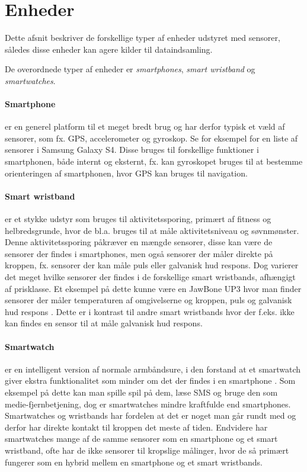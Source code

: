 \section{Enheder}\label{sec:kilder-til-sensorer}
Dette afsnit beskriver de forskellige typer af enheder udstyret med sensorer, således disse enheder kan agere kilder til dataindsamling.

De overordnede typer af enheder er \textit{smartphones}, \textit{smart wristband} og \textit{smartwatches}. 

\paragraph{Smartphone}
er en generel platform til et meget bredt brug og har derfor typisk et væld af sensorer, som fx. GPS, accelerometer og gyroskop. 
Se for eksempel \citet{misc:samsungs4sensors} for en liste af sensorer i Samsung Galaxy S4.
Disse bruges til forskellige funktioner i smartphonen, både internt og eksternt, fx. kan gyroskopet bruges til at bestemme orienteringen af smartphonen, hvor GPS kan bruges til navigation.

\paragraph{Smart wristband} %
er et stykke udstyr som bruges til aktivitetssporing, primært af fitness og helbredsgrunde, hvor de bl.a. bruges til at måle aktivitetsniveau og søvnmønster.
Denne aktivitetssporing påkræver en mængde sensorer, disse kan være de sensorer der findes i smartphones, men også sensorer der måler direkte på kroppen, fx. sensorer der kan måle puls eller galvanisk hud respons. 
Dog varierer det meget hvilke sensorer der findes i de forskellige smart wristbands, afhængigt af prisklasse.
Et eksempel på dette kunne være en JawBone UP3 hvor man finder sensorer der måler temperaturen af omgivelserne og kroppen, puls og galvanisk hud respons \citep{misc:jawboneup3sensors}. 
Dette er i kontrast til andre smart wristbands hvor der f.eks. ikke kan findes en sensor til at måle galvanisk hud respons.

\paragraph{Smartwatch}
er en intelligent version af normale armbåndsure, i den forstand at et smartwatch giver ekstra funktionalitet som minder om det der findes i en smartphone \citep{msic:smartwatchstate}. 
Som eksempel på dette kan man spille spil på dem, læse SMS og bruge den som medie-fjernbetjening, dog er smartwatches mindre kraftfulde end smartphones. 
Smartwatches og wristbands har fordelen at det er noget man går rundt med og derfor har direkte kontakt til kroppen det meste af tiden.
Endvidere har smartwatches mange af de samme sensorer som en smartphone og et smart wristband, ofte har de ikke sensorer til kropslige målinger, hvor de så primært fungerer som en hybrid mellem en smartphone og et smart wristbands.

